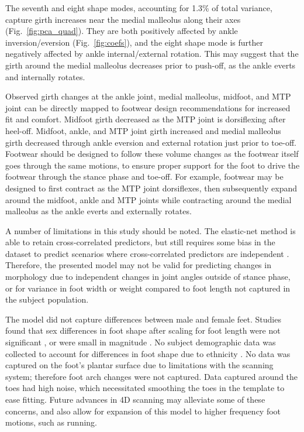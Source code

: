 \documentclass[preprint]{elsarticle}
\begin{document}
The seventh and eight shape modes, accounting for 1.3\% of total variance, capture girth increases near the medial malleolus along their axes (Fig.~\ref{fig:pca_quad}).
They are both positively affected by ankle inversion/eversion (Fig.~\ref{fig:coefs}), and the eight shape mode is further negatively affected by ankle internal/external rotation.
This may suggest that the girth around the medial malleolus decreases prior to push-off, as the ankle everts and internally rotates.

Observed girth changes at the ankle joint, medial malleolus, midfoot, and MTP joint can be directly mapped to footwear design recommendations for increased fit and comfort. Midfoot girth decreased as the MTP joint is dorsiflexing after heel-off.
Midfoot, ankle, and MTP joint girth increased and medial malleolus girth decreased through ankle eversion and external rotation just prior to toe-off.
Footwear should be designed to follow these volume changes as the footwear itself goes through the same motions, to ensure proper support for the foot to drive the footwear through the stance phase and toe-off.
For example, footwear may be designed to first contract as the MTP joint dorsiflexes, then subsequently expand around the midfoot, ankle and MTP joints while contracting around the medial malleolus as the ankle everts and externally rotates.

A number of limitations in this study should be noted.
The elastic-net method is able to retain cross-correlated predictors, but still requires some bias in the dataset to predict scenarios where cross-correlated predictors are independent \citep{Zou2005}.
Therefore, the presented model may not be valid for predicting changes in morphology due to independent changes in joint angles outside of stance phase, or for variance in foot width or weight compared to foot length not captured in the subject population.

The model did not capture differences between male and female feet.
Studies found that sex differences in foot shape after scaling for foot length were not significant \citep{Kouchi2009, Barisch-Fritz2014a, Conrad2019}, or were small in magnitude \citep{Wunderlich2001, Krauss2008}.
No subject demographic data was collected to account for differences in foot shape due to ethnicity \citep{Jurca2019}.
No data was captured on the foot's plantar surface due to limitations with the scanning system; therefore foot arch changes were not captured.
Data captured around the toes had high noise, which necessitated smoothing the toes in the template to ease fitting.
Future advances in 4D scanning may alleviate some of these concerns, and also allow for expansion of this model to higher frequency foot motions, such as running.
\end{document}
